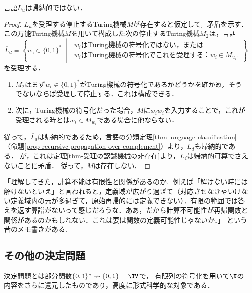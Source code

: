 \begin{theorem}[停止性判定問題は解けない]\label{thm-undecidableness-of-halting-problem}
    言語$L_u$は帰納的ではない．
\end{theorem}
\begin{proof}
    $L_u$を受理する停止するTuring機械$M$が存在すると仮定して，矛盾を示す．
    この万能Turing機械$M$を用いて構成した次の停止するTuring機械$M_2$は，言語
    \[\overline{L}_d=\left\{w_i\in\{0,1\}^*\;\middle|\;\begin{array}{l}
        w_iは\mathrm{Turing}機械の符号化ではない，または\\
        w_iは\mathrm{Turing}機械の符号化でこれを受理する：w_i\in M_{w_i}.
    \end{array}\right\}\]
    を受理する．
    \begin{enumerate}
        \item $M_2$はまず$w_i\in\{0,1\}^*$がTuring機械の符号化であるかどうかを確かめ，そうでないならば受理して停止する．これは構成できる．
        \item 次に，Turing機械の符号化だった場合，$M$に$w_iw_i$を入力することで，これが受理される時とは$w_i\in M_{w_i}$である場合に他ならない．
    \end{enumerate}
    従って，$\overline{L}_d$は帰納的であるため，言語の分類定理\ref{thm-language-classification}（命題\ref{prop-recursive-propagation-over-complement}）より，$L_d$も帰納的である．
    が，これは定理\ref{thm-受理の認識機械の非存在}より，$L_d$は帰納的可算でさえないことに矛盾．
    従って，$M$は存在しない．
\end{proof}
\begin{remarks}
    「理解してきた，計算不能は有限性と関係があるのか．例えば「解けない時には解けないといえ」と言われると，定義域が広がり過ぎて（対応させなきゃいけない定義域内の元が多過ぎて，原始再帰的には定義できない），有限の範囲では答えを返す算譜がないって感じだろうな．ああ，だから計算不可能性が再帰関数と関係があるのかもしれない．これは要は関数の定義可能性じゃないか．」
    という昔のメモ書きがある．
\end{remarks}

\subsection{その他の決定問題}

\begin{tcolorbox}[colframe=ForestGreen, colback=ForestGreen!10!white, breakable]
    決定問題とは部分関数$\{0,1\}^*\nrightarrow\{0,1\}=\TV$で，
    有限列の符号化を用いて$\N$の内容をさらに還元したものであり，高度に形式科学的な対象である．
\end{tcolorbox}

